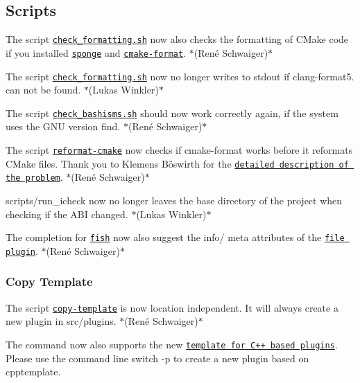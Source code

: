 \subsection*{Scripts}


\begin{DoxyItemize}
\item The script \href{https://master.libelektra.org/tests/shell/check_formatting.sh}{\tt {\ttfamily check\+\_\+formatting.\+sh}} now also checks the formatting of C\+Make code if you installed \href{https://joeyh.name/code/moreutils}{\tt {\ttfamily sponge}} and \href{https://github.com/cheshirekow/cmake_format}{\tt {\ttfamily cmake-\/format}}. $\ast$(René Schwaiger)$\ast$
\item The script \href{https://master.libelektra.org/tests/shell/check_formatting.sh}{\tt {\ttfamily check\+\_\+formatting.\+sh}} now no longer writes to stdout if clang-\/format5. can not be found. $\ast$(Lukas Winkler)$\ast$
\item The script \href{https://master.libelektra.org/tests/shell/check_bashisms.sh}{\tt {\ttfamily check\+\_\+bashisms.\+sh}} should now work correctly again, if the system uses the G\+NU version {\ttfamily find}. $\ast$(René Schwaiger)$\ast$
\item The script \href{https://master.libelektra.org/scripts/reformat-cmake}{\tt {\ttfamily reformat-\/cmake}} now checks if {\ttfamily cmake-\/format} works before it reformats C\+Make files. Thank you to Klemens Böswirth for the \href{https://github.com/ElektraInitiative/libelektra/pull/1903#discussion_r189332987}{\tt detailed description of the problem}. $\ast$(René Schwaiger)$\ast$
\item {\ttfamily scripts/run\+\_\+icheck} now no longer leaves the base directory of the project when checking if the A\+BI changed. $\ast$(Lukas Winkler)$\ast$
\item The completion for \href{http://fishshell.com}{\tt fish} now also suggest the {\ttfamily info/} meta attributes of the \href{https://www.libelektra.org/plugins/file}{\tt file plugin}. $\ast$(René Schwaiger)$\ast$
\end{DoxyItemize}

\subsubsection*{Copy Template}


\begin{DoxyItemize}
\item The script \href{https://master.libelektra.org/scripts/copy-template}{\tt {\ttfamily copy-\/template}} is now location independent. It will always create a new plugin in {\ttfamily src/plugins}. $\ast$(René Schwaiger)$\ast$
\item The command now also supports the new \href{https://www.libelektra.org/plugins/cpptemplate}{\tt template for C++ based plugins}. Please use the command line switch {\ttfamily -\/p} to create a new plugin based on {\ttfamily cpptemplate}.
\end{DoxyItemize}


